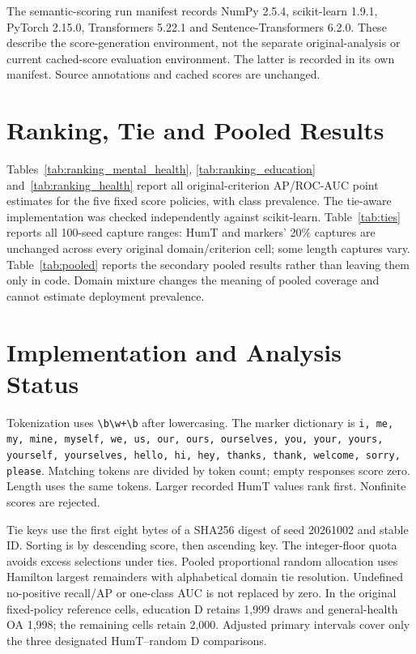 The semantic-scoring run manifest records NumPy 2.5.4, scikit-learn 1.9.1, PyTorch 2.15.0, Transformers 5.22.1 and Sentence-Transformers 6.2.0. These describe the score-generation environment, not the separate original-analysis or current cached-score evaluation environment. The latter is recorded in its own manifest. Source annotations and cached scores are unchanged.

\clearpage
\section{Ranking, Tie and Pooled Results}\label{app:rankings}
Tables~\ref{tab:ranking_mental_health}, \ref{tab:ranking_education} and~\ref{tab:ranking_health} report all original-criterion AP/ROC-AUC point estimates for the five fixed score policies, with class prevalence. The tie-aware implementation was checked independently against scikit-learn. Table~\ref{tab:ties} reports all 100-seed capture ranges: HumT and markers' 20\% captures are unchanged across every original domain/criterion cell; some length captures vary. Table~\ref{tab:pooled} reports the secondary pooled results rather than leaving them only in code. Domain mixture changes the meaning of pooled coverage and cannot estimate deployment prevalence.






\clearpage
\section{Implementation and Analysis Status}\label{app:implementation}
Tokenization uses \verb|\b\w+\b| after lowercasing. The marker dictionary is \texttt{i, me, my, mine, myself, we, us, our, ours, ourselves, you, your, yours, yourself, yourselves, hello, hi, hey, thanks, thank, welcome, sorry, please}. Matching tokens are divided by token count; empty responses score zero. Length uses the same tokens. Larger recorded HumT values rank first. Nonfinite scores are rejected.

Tie keys use the first eight bytes of a SHA256 digest of seed 20261002 and stable ID. Sorting is by descending score, then ascending key. The integer-floor quota avoids excess selections under ties. Pooled proportional random allocation uses Hamilton largest remainders with alphabetical domain tie resolution. Undefined no-positive recall/AP or one-class AUC is not replaced by zero. In the original fixed-policy reference cells, education D retains 1,999 draws and general-health OA 1,998; the remaining cells retain 2,000. Adjusted primary intervals cover only the three designated HumT--random D comparisons.

